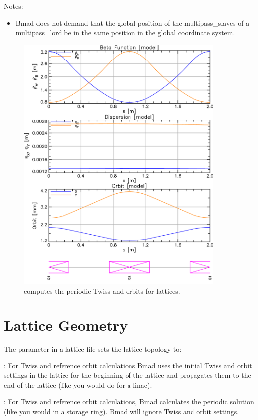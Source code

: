 \documentclass{hitec}
\newcommand{\Section}[1]{\section{#1}\vspace*{-1ex}}
\begin{document}
Notes:
\begin{itemize}
\item Bmad does not demand that the global position of the multipass_slaves of a multipass_lord be in
the same position in the global coordinate system.
\end{itemize}

\begin{figure}[tb]
  \centering
  \includegraphics[width=0.9\textwidth]{geometry.pdf}
  \caption{\bmad computes the periodic Twiss and orbits for  lattices.}
  \label{f:geometry}
\end{figure}

\Section{Lattice Geometry}

The  parameter in a lattice file sets the lattice topology to:
\begin{description}
\item {}: For Twiss and reference orbit calculations Bmad uses the initial Twiss 
and orbit settings in the lattice for the beginning of the lattice and
propagates them to the end of the lattice (like you would do for a linac). 
\item {}: For Twiss and reference orbit calculations, Bmad calculates the 
periodic solution (like you would in a storage ring). 
Bmad will ignore Twiss and orbit settings.
\end{description}
\end{document}
